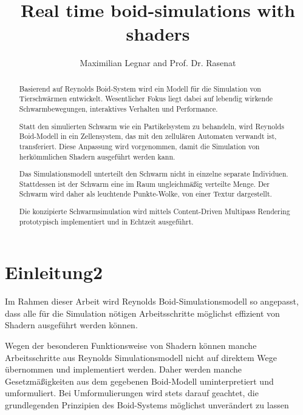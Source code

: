 \documentclass[a4paper, 10pt, journal]{wissarbIEEE}      %
\title{\LARGE \bf
Real time boid-simulations with shaders
}
\author{Maximilian Legnar and Prof. Dr. Rasenat}%
\begin{document}
\maketitle

\begin{abstract}




Basierend auf Reynolds Boid-System \cite{Reynolds87flocks} wird ein Modell für die Simulation von Tierschwärmen entwickelt. Wesentlicher Fokus liegt dabei auf lebendig wirkende Schwarmbewegungen, interaktives Verhalten und Performance. 

Statt den simulierten Schwarm wie ein Partikelsystem zu behandeln, wird Reynolds Boid-Modell in ein Zellensystem, das mit den zellulären Automaten verwandt ist, transferiert. Diese Anpassung wird vorgenommen, damit die Simulation von herkömmlichen Shadern ausgeführt werden kann.

Das Simulationsmodell unterteilt den Schwarm nicht in einzelne separate Individuen. Stattdessen ist der Schwarm eine im Raum ungleichmäßig verteilte Menge.
Der Schwarm wird daher als leuchtende Punkte-Wolke, von einer Textur dargestellt.

Die konzipierte Schwarmsimulation wird mittels Content-Driven Multipass Rendering prototypisch implementiert und in Echtzeit ausgeführt.

\end{abstract}

\section{Einleitung2}
Im Rahmen dieser Arbeit wird Reynolds Boid-Simulationsmodell so angepasst, dass alle für die Simulation nötigen Arbeitsschritte möglichst effizient von Shadern ausgeführt werden können.

Wegen der besonderen Funktionsweise von Shadern können manche Arbeitsschritte aus Reynolds Simulationsmodell nicht auf direktem Wege übernommen und implementiert werden. Daher werden manche Gesetzmäßigkeiten aus dem gegebenen Boid-Modell uminterpretiert und umformuliert. Bei Umformulierungen wird stets darauf geachtet, die grundlegenden Prinzipien des Boid-Systems möglichst unverändert zu lassen
\end{document}

